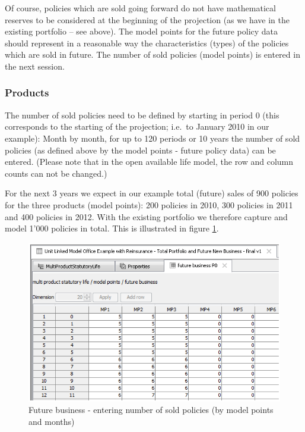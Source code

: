 Of course, policies which are sold going forward do not have mathematical reserves to be considered at the beginning of the projection (as we have in the existing portfolio -- see above). The model points for the future policy data should represent in a reasonable way the characteristics (types) of the policies which are sold in future. The number of sold policies (model points) is entered in the next session.

\subsubsection{Products} %

The number of sold policies need to be defined by starting in period 0 (this corresponds to the starting of the projection; i.e.~to January 2010 in our example): Month by month, for up to 120 periods or 10 years the number of sold policies (as defined above by the model points - future policy data) can be entered. (Please note that in the open available life model, the row and column counts can not be changed.)

For the next 3 years we expect in our example total (future) sales of 900 policies for the three products (model points): 200 policies in 2010, 300 policies in 2011 and 400 policies in 2012. With the existing portfolio we therefore capture and model 1'000 policies in total. This is illustrated in figure \ref{fig:mdpfuturebusiness}. 

\begin{figure}
\includegraphics[scale=0.7]{images/mdpfuturebusiness.png}
	\caption{Future business - entering number of sold policies (by model points and months)}
	\label{fig:mdpfuturebusiness}
\end{figure}

